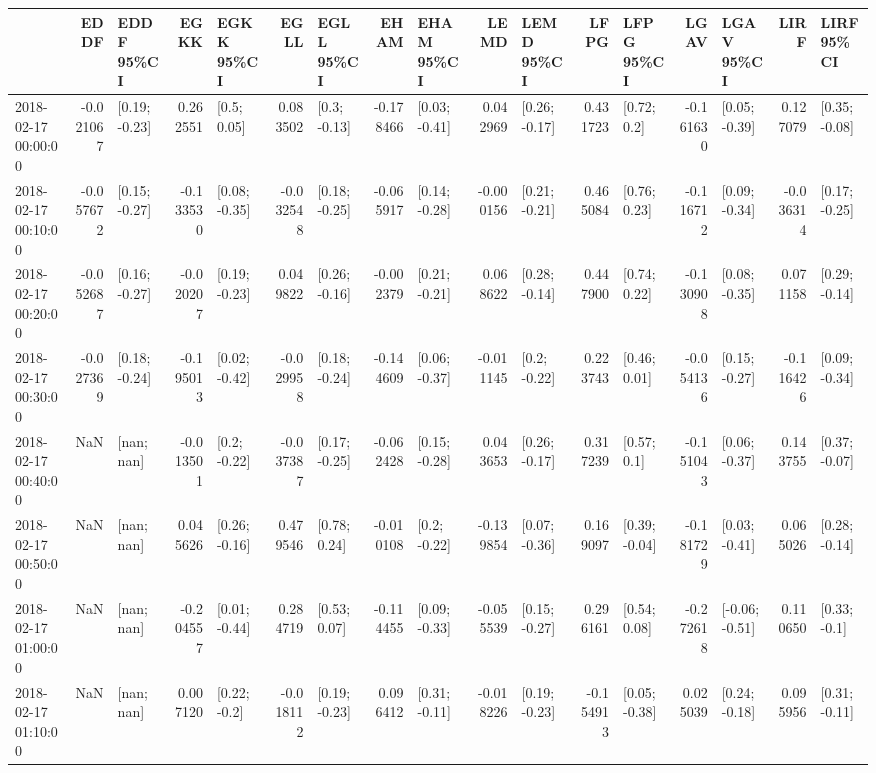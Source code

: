 \begin{tabular}{lrlrlrlrlrlrlrlrl}
\toprule
{} &      EDDF &      EDDF 95\%CI &      EGKK &      EGKK 95\%CI &      EGLL &      EGLL 95\%CI &      EHAM &      EHAM 95\%CI &      LEMD &      LEMD 95\%CI &      LFPG &      LFPG 95\%CI &      LGAV &      LGAV 95\%CI &      LIRF &      LIRF 95\%CI \\
\midrule
2018-02-17 00:00:00 & -0.021067 &   [0.19; -0.23] &  0.262551 &     [0.5; 0.05] &  0.083502 &    [0.3; -0.13] & -0.178466 &   [0.03; -0.41] &  0.042969 &   [0.26; -0.17] &  0.431723 &     [0.72; 0.2] & -0.161630 &   [0.05; -0.39] &  0.127079 &   [0.35; -0.08] \\
2018-02-17 00:10:00 & -0.057672 &   [0.15; -0.27] & -0.133530 &   [0.08; -0.35] & -0.032548 &   [0.18; -0.25] & -0.065917 &   [0.14; -0.28] & -0.000156 &   [0.21; -0.21] &  0.465084 &    [0.76; 0.23] & -0.116712 &   [0.09; -0.34] & -0.036314 &   [0.17; -0.25] \\
2018-02-17 00:20:00 & -0.052687 &   [0.16; -0.27] & -0.020207 &   [0.19; -0.23] &  0.049822 &   [0.26; -0.16] & -0.002379 &   [0.21; -0.21] &  0.068622 &   [0.28; -0.14] &  0.447900 &    [0.74; 0.22] & -0.130908 &   [0.08; -0.35] &  0.071158 &   [0.29; -0.14] \\
2018-02-17 00:30:00 & -0.027369 &   [0.18; -0.24] & -0.195013 &   [0.02; -0.42] & -0.029958 &   [0.18; -0.24] & -0.144609 &   [0.06; -0.37] & -0.011145 &    [0.2; -0.22] &  0.223743 &    [0.46; 0.01] & -0.054136 &   [0.15; -0.27] & -0.116426 &   [0.09; -0.34] \\
2018-02-17 00:40:00 &       NaN &      [nan; nan] & -0.013501 &    [0.2; -0.22] & -0.037387 &   [0.17; -0.25] & -0.062428 &   [0.15; -0.28] &  0.043653 &   [0.26; -0.17] &  0.317239 &     [0.57; 0.1] & -0.151043 &   [0.06; -0.37] &  0.143755 &   [0.37; -0.07] \\
2018-02-17 00:50:00 &       NaN &      [nan; nan] &  0.045626 &   [0.26; -0.16] &  0.479546 &    [0.78; 0.24] & -0.010108 &    [0.2; -0.22] & -0.139854 &   [0.07; -0.36] &  0.169097 &   [0.39; -0.04] & -0.181729 &   [0.03; -0.41] &  0.065026 &   [0.28; -0.14] \\
2018-02-17 01:00:00 &       NaN &      [nan; nan] & -0.204557 &   [0.01; -0.44] &  0.284719 &    [0.53; 0.07] & -0.114455 &   [0.09; -0.33] & -0.055539 &   [0.15; -0.27] &  0.296161 &    [0.54; 0.08] & -0.272618 &  [-0.06; -0.51] &  0.110650 &    [0.33; -0.1] \\
2018-02-17 01:10:00 &       NaN &      [nan; nan] &  0.007120 &    [0.22; -0.2] & -0.018112 &   [0.19; -0.23] &  0.096412 &   [0.31; -0.11] & -0.018226 &   [0.19; -0.23] & -0.154913 &   [0.05; -0.38] &  0.025039 &   [0.24; -0.18] &  0.095956 &   [0.31; -0.11] \\

\end{tabular}
